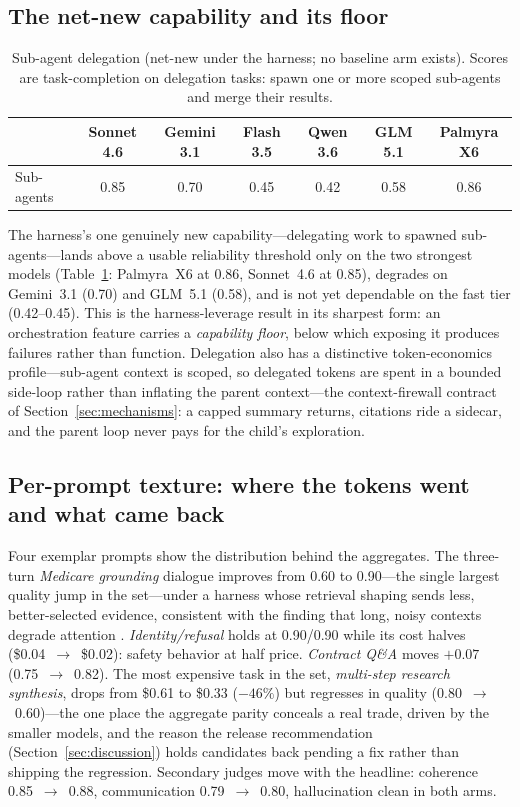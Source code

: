 \documentclass[11pt]{article}
\begin{document}
\subsection{The net-new capability and its floor}
\label{sec:subagents}

\begin{table}[t]
\centering\small
\caption{Sub-agent delegation (net-new under the harness; no baseline arm exists). Scores are task-completion on delegation tasks: spawn one or more scoped sub-agents and merge their results.}
\label{tab:subagents}
\begin{tabular}{@{}lcccccc@{}}
\toprule
 & Sonnet 4.6 & Gemini 3.1 & Flash 3.5 & Qwen 3.6 & GLM 5.1 & Palmyra X6 \\
\midrule
Sub-agents & 0.85 & 0.70 & 0.45 & 0.42 & 0.58 & 0.86 \\
\bottomrule
\end{tabular}
\end{table}

The harness's one genuinely new capability---delegating work to spawned sub-agents---lands above a usable reliability threshold only on the two strongest models (Table~\ref{tab:subagents}: Palmyra~X6 at 0.86, Sonnet~4.6 at 0.85), degrades on Gemini~3.1 (0.70) and GLM~5.1 (0.58), and is not yet dependable on the fast tier (0.42--0.45). This is the harness-leverage result in its sharpest form: an orchestration feature carries a \emph{capability floor}, below which exposing it produces failures rather than function. Delegation also has a distinctive token-economics profile---sub-agent context is scoped, so delegated tokens are spent in a bounded side-loop rather than inflating the parent context---the context-firewall contract of Section~\ref{sec:mechanisms}: a capped summary returns, citations ride a sidecar, and the parent loop never pays for the child's exploration.

\subsection{Per-prompt texture: where the tokens went and what came back}
\label{sec:cases}

Four exemplar prompts show the distribution behind the aggregates. The three-turn \emph{Medicare grounding} dialogue improves from 0.60 to 0.90---the single largest quality jump in the set---under a harness whose retrieval shaping sends less, better-selected evidence, consistent with the finding that long, noisy contexts degrade attention \cite{lost}. \emph{Identity/refusal} holds at 0.90/0.90 while its cost halves (\$0.04~$\rightarrow$~\$0.02): safety behavior at half price. \emph{Contract Q\&A} moves $+0.07$ (0.75~$\rightarrow$~0.82). The most expensive task in the set, \emph{multi-step research synthesis}, drops from \$0.61 to \$0.33 ($-46\%$) but regresses in quality (0.80~$\rightarrow$~0.60)---the one place the aggregate parity conceals a real trade, driven by the smaller models, and the reason the release recommendation (Section~\ref{sec:discussion}) holds candidates back pending a fix rather than shipping the regression. Secondary judges move with the headline: coherence 0.85~$\rightarrow$~0.88, communication 0.79~$\rightarrow$~0.80, hallucination clean in both arms.
\end{document}
